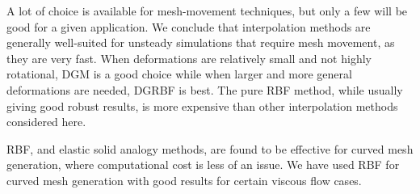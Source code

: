 \documentclass[letterpaper,11pt]{article}
\begin{document}
A lot of choice is available for mesh-movement techniques, but only a few will be good for a given application. We conclude that interpolation methods are generally well-suited for unsteady simulations that require mesh movement, as they are very fast. When deformations are relatively small and not highly rotational, DGM is a good choice while when larger and more general deformations are needed, DGRBF is best. The pure RBF method, while usually giving good robust results, is more expensive than other interpolation methods considered here. 

RBF, and elastic solid analogy methods, are found to be effective for curved mesh generation, where computational cost is less of an issue. We have used RBF for curved mesh generation with good results for certain viscous flow cases.

\end{document}
